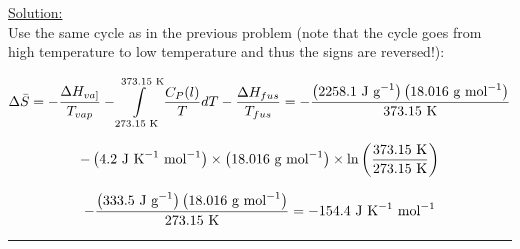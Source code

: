 \noindent
\underline{Solution:}\\


Use the same cycle as in the previous problem (note that the cycle goes from high temperature to low temperature and thus the signs are reversed!):

$$\Delta\bar{S} = -\frac{\Delta H_{va]}}{T_{vap}} - \int\limits_{273.15\textnormal{ K}}^{373.15\textnormal{ K}}\frac{C_P(l)}{T}dT - \frac{\Delta H_{fus}}{T_{fus}} = -\frac{\left(2258.1\textnormal{ J g}^{-1}\right)\left(18.016\textnormal{ g mol}^{-1}\right)}{373.15\textnormal{ K}}$$

$$-\left(4.2\textnormal{ J K}^{-1}\textnormal{ mol}^{-1}\right)\times\left(18.016\textnormal{ g mol}^{-1}\right)\times\ln\left(\frac{373.15\textnormal{ K}}{273.15\textnormal{ K}}\right)$$

$$ - \frac{\left(333.5\textnormal{ J g}^{-1}\right)\left(18.016\textnormal{ g mol}^{-1}\right)}{273.15\textnormal{ K}} = -154.4\textnormal{ J K}^{-1}\textnormal{ mol}^{-1}$$

\hrule\vspace{0.5cm}
